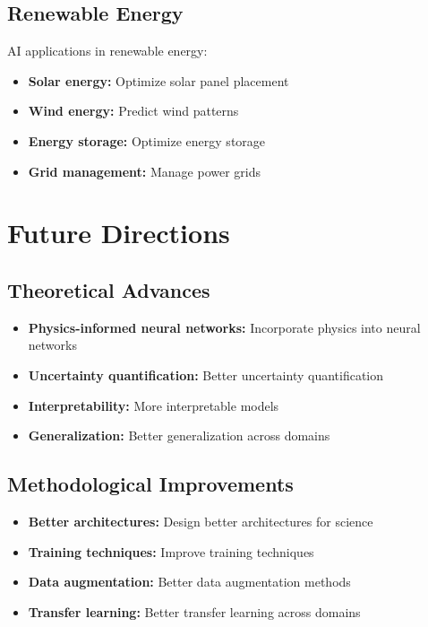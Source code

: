 \subsection{Renewable Energy}

AI applications in renewable energy:
\begin{itemize}
    \item \textbf{Solar energy:} Optimize solar panel placement
    \item \textbf{Wind energy:} Predict wind patterns
    \item \textbf{Energy storage:} Optimize energy storage
    \item \textbf{Grid management:} Manage power grids
\end{itemize}

\section{Future Directions}

\subsection{Theoretical Advances}

\begin{itemize}
    \item \textbf{Physics-informed neural networks:} Incorporate physics into neural networks
    \item \textbf{Uncertainty quantification:} Better uncertainty quantification
    \item \textbf{Interpretability:} More interpretable models
    \item \textbf{Generalization:} Better generalization across domains
\end{itemize}

\subsection{Methodological Improvements}

\begin{itemize}
    \item \textbf{Better architectures:} Design better architectures for science
    \item \textbf{Training techniques:} Improve training techniques
    \item \textbf{Data augmentation:} Better data augmentation methods
    \item \textbf{Transfer learning:} Better transfer learning across domains
\end{itemize}

